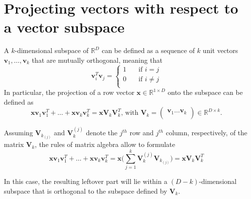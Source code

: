 \documentclass{report}
\begin{document}
\section{Projecting vectors with respect to a vector subspace}
A $\displaystyle k$-dimensional subspace of $\displaystyle \mathbb{R}^D$ can be defined as a sequence of $\displaystyle k$ unit vectors $\displaystyle \mathbf{v}_1, \dots, \mathbf{v}_k$ that are mutually orthogonal, meaning that
\[\mathbf{v}_i^T\mathbf{v}_j = \begin{cases}
    1 &\quad\text{if $i = j$} \\
    0 &\quad\text{if $i \neq j$} \\
\end{cases}\]
In particular, the projection of a row vector $\displaystyle \mathbf{x} \in \mathbb{R}^{1 \times D}$ onto the subspace can be defined as
\[\mathbf{x}\mathbf{v}_1\mathbf{v}_1^T + \dots + \mathbf{x}\mathbf{v}_k\mathbf{v}_k^T = \mathbf{x}\mathbf{V}_k\mathbf{V}_k^T \text{, with $\mathbf{V}_k = \begin{pmatrix}
    \mathbf{v}_1 \dots \mathbf{v}_k \\
\end{pmatrix} \in \mathbb{R}^{D \times k}$.}\]
\begin{proofbox}
    Assuming $\displaystyle \mathbf{V}_{k_{(j)}}$ and $\displaystyle \mathbf{V}_k^{(j)}$ denote the $\displaystyle j^{th}$ row and $\displaystyle j^{th}$ column, respectively, of the matrix $\displaystyle \mathbf{V}_k$, the rules of matrix algebra allow to formulate
    \[\mathbf{x}\mathbf{v}_1\mathbf{v}_1^T + \dots + \mathbf{x}\mathbf{v}_k\mathbf{v}_k^T = \mathbf{x}\Bigg(\sum_{j = 1}^k \mathbf{V}_k^{(j)}\mathbf{V}_{k_{(j)}}\Bigg) = \mathbf{x}\mathbf{V}_k\mathbf{V}_k^T\]
\end{proofbox}
\noindent In this case, the resulting leftover part will lie within a $\displaystyle (D - k)$-dimensional subspace that is orthogonal to the subspace defined by $\displaystyle \mathbf{V}_k$.
\end{document}
